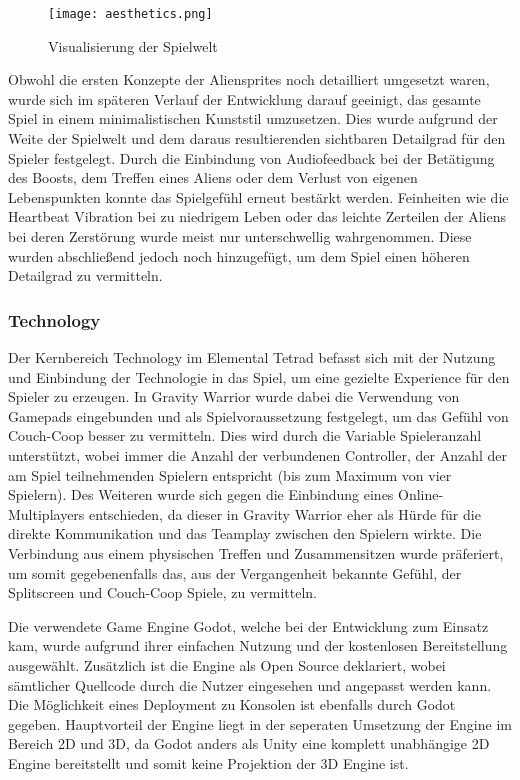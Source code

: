 \documentclass[11pt]{scrartcl}
\begin{document}
\begin{figure}[htp]
	\centering
	\texttt{[image: aesthetics.png]}
	\caption{Visualisierung der Spielwelt}
	\label{fig:aesthetics}
\end{figure}

 
Obwohl die ersten Konzepte der Aliensprites noch detailliert umgesetzt waren, wurde sich im späteren Verlauf der Entwicklung darauf geeinigt, das gesamte Spiel in einem minimalistischen Kunststil umzusetzen. Dies wurde aufgrund der Weite der Spielwelt und dem daraus resultierenden sichtbaren Detailgrad für den Spieler festgelegt.
Durch die Einbindung von Audiofeedback bei der Betätigung des Boosts, dem Treffen eines Aliens oder dem Verlust von eigenen Lebenspunkten konnte das Spielgefühl erneut bestärkt werden. Feinheiten wie die Heartbeat Vibration bei zu niedrigem Leben oder das leichte Zerteilen der Aliens bei deren Zerstörung wurde meist nur unterschwellig wahrgenommen. Diese wurden abschließend jedoch noch hinzugefügt, um dem Spiel einen höheren Detailgrad zu vermitteln.

\subsubsection{Technology}
\label{subsec:tech}
Der Kernbereich Technology im Elemental Tetrad befasst sich mit der Nutzung und Einbindung der Technologie in das Spiel, um eine gezielte Experience für den Spieler zu erzeugen\cite[~p.412]{S2014}. In Gravity Warrior wurde dabei die Verwendung von Gamepads eingebunden und als Spielvoraussetzung festgelegt, um das Gefühl von Couch-Coop besser zu vermitteln. Dies wird durch die Variable Spieleranzahl unterstützt, wobei immer die Anzahl der verbundenen Controller, der Anzahl der am Spiel teilnehmenden Spielern entspricht (bis zum Maximum von vier Spielern). Des Weiteren wurde sich gegen die Einbindung eines Online-Multiplayers entschieden, da dieser in Gravity Warrior eher als Hürde für die direkte Kommunikation und das Teamplay zwischen den Spielern wirkte. Die Verbindung aus einem physischen Treffen und Zusammensitzen wurde präferiert, um somit gegebenenfalls das, aus der Vergangenheit bekannte Gefühl, der Splitscreen und Couch-Coop Spiele, zu vermitteln.

Die verwendete Game Engine Godot, welche bei der Entwicklung zum Einsatz kam, wurde aufgrund ihrer einfachen Nutzung und der kostenlosen Bereitstellung ausgewählt. Zusätzlich ist die Engine als Open Source deklariert, wobei sämtlicher Quellcode durch die Nutzer eingesehen und angepasst werden kann. Die Möglichkeit eines Deployment zu Konsolen ist ebenfalls durch Godot gegeben. Hauptvorteil der Engine liegt in der seperaten Umsetzung der Engine im Bereich 2D und 3D, da Godot anders als Unity eine komplett unabhängige 2D Engine bereitstellt und somit keine Projektion der 3D Engine ist\cite{G2019}.
\end{document}
